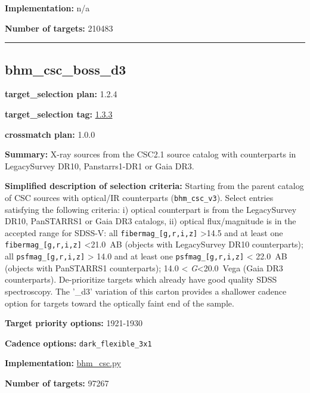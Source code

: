 \noindent\textbf{Implementation:} n/a

\noindent\textbf{Number of targets:} 210483

\begin{center}\rule{0.5\linewidth}{0.5pt}\end{center}

\hypertarget{bhm_csc_boss_d3_plan1.2.4}{%
\subsection{bhm\_csc\_boss\_d3}\label{bhm_csc_boss_d3_plan1.2.4}}

\noindent\textbf{target\_selection plan:} 1.2.4

\noindent\textbf{target\_selection tag:}
\href{https://github.com/sdss/target_selection/tree/1.3.3/}{1.3.3}

\noindent\textbf{crossmatch plan:} 1.0.0

\noindent\textbf{Summary:} X-ray sources from the CSC2.1 source catalog with
counterparts in LegacySurvey DR10, Panstarrs1-DR1 or Gaia DR3.

\noindent\textbf{Simplified description of selection criteria:} Starting from the
parent catalog of CSC sources with optical/IR counterparts
(\texttt{bhm\_csc\_v3}). Select entries satisfying the following
criteria: i) optical counterpart is from the LegacySurvey DR10,
PanSTARRS1 or Gaia DR3 catalogs, ii) optical flux/magnitude is in the
accepted range for SDSS-V: all \texttt{fibermag\_{[}g,r,i,z{]}}
\textgreater14.5 and at least one \texttt{fibermag\_{[}g,r,i,z{]}}
\textless21.0~AB (objects with LegacySurvey DR10 counterparts); all
\texttt{psfmag\_{[}g,r,i,z{]}} \textgreater{} 14.0 and at least one
\texttt{psfmag\_{[}g,r,i,z{]}} \textless{} 22.0~AB (objects with
PanSTARRS1 counterparts); 14.0 \textless{} \emph{G}\textless20.0~Vega
(Gaia DR3 counterparts). De-prioritize targets which already have good
quality SDSS spectroscopy. The '\_d3' variation of this carton provides
a shallower cadence option for targets toward the optically faint end of
the sample.


\noindent\textbf{Target priority options:} 1921-1930

\noindent\textbf{Cadence options:} \texttt{dark\_flexible\_3x1}

\noindent\textbf{Implementation:}
\href{https://github.com/sdss/target_selection/blob/1.3.3/python/target_selection/cartons/bhm_csc.py}{bhm\_csc.py}

\noindent\textbf{Number of targets:} 97267

